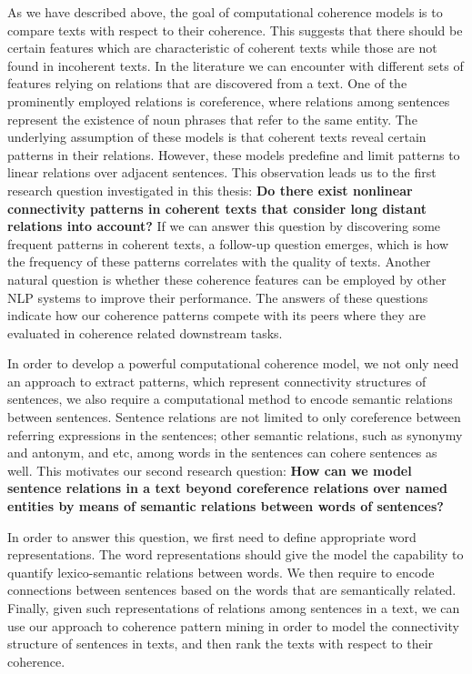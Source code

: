 As we have described above, the goal of computational coherence models is to compare texts with respect to their coherence. 
This suggests that there should be certain features which are characteristic of coherent texts while those are not found in incoherent texts. 
In the literature we can encounter with different sets of features relying on relations that are discovered from a text. 
One of the prominently employed relations is coreference, where relations among sentences represent the existence of noun phrases that refer to the same entity. 
The underlying assumption of these models is that coherent texts reveal certain patterns in their relations. 
However, these models predefine and limit patterns to linear relations over adjacent sentences. 
This observation leads us to the first research question investigated in this thesis: 
\textbf{Do there exist nonlinear connectivity patterns in coherent texts that consider long distant relations into account?} 
If we can answer this question by discovering some frequent patterns in coherent texts, a follow-up question emerges, which is how the frequency of these patterns correlates with the quality of texts. 
Another natural question is whether these coherence features can be employed by other NLP systems to improve their performance. 
The answers of these questions indicate how our coherence patterns compete with its peers where they are evaluated in coherence related downstream tasks. 

In order to develop a powerful computational coherence model, we not only need an approach to extract patterns, which represent connectivity structures of sentences, we also require a computational method to encode semantic relations between sentences. 
Sentence relations are not limited to only coreference between referring expressions in the sentences; other semantic relations, such as synonymy and antonym, and etc, among words in the sentences can cohere sentences as well. 
This motivates our second research question: 
\textbf{How can we model sentence relations in a text beyond coreference relations over named entities by means of semantic relations between words of sentences?} 

In order to answer this question, we first need to define appropriate word representations.  
The word representations should give the model the capability to quantify lexico-semantic relations between words. 
We then require to encode connections between sentences based on the words that are semantically related. 
Finally, given such representations of relations among sentences in a text, we can use our approach to coherence pattern mining in order to model the connectivity structure of sentences in texts, and then rank the texts with respect to their coherence. 

